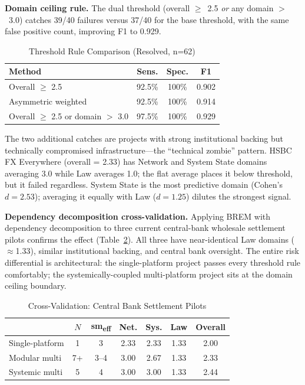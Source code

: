 \documentclass[conference]{IEEEtran}
\begin{document}
\textbf{Domain ceiling rule.} The dual threshold (overall $\geq$~2.5 \textit{or} any domain $>$~3.0) catches 39/40 failures versus 37/40 for the base threshold, with the same false positive count, improving F1 to 0.929.

\begin{table}[htbp]
\caption{Threshold Rule Comparison (Resolved, n=62)}
\label{tab:thresholds}
\centering
\begin{tabular}{lccc}
\toprule
\textbf{Method} & \textbf{Sens.} & \textbf{Spec.} & \textbf{F1} \\
\midrule
Overall $\geq$ 2.5 & 92.5\% & 100\% & 0.902 \\
Asymmetric weighted & 92.5\% & 100\% & 0.914 \\
Overall $\geq$ 2.5 or domain $>$ 3.0 & 97.5\% & 100\% & 0.929 \\
\bottomrule
\end{tabular}
\end{table}

The two additional catches are projects with strong institutional backing but technically compromised infrastructure---the ``technical zombie'' pattern. HSBC FX Everywhere (overall = 2.33) has Network and System State domains averaging 3.0 while Law averages 1.0; the flat average places it below threshold, but it failed regardless. System State is the most predictive domain (Cohen's $d = 2.53$); averaging it equally with Law ($d = 1.25$) dilutes the strongest signal.

\textbf{Dependency decomposition cross-validation.} Applying BREM with dependency decomposition to three current central-bank wholesale settlement pilots confirms the effect (Table~\ref{tab:crossval}). All three have near-identical Law domains ($\approx$1.33), similar institutional backing, and central bank oversight. The entire risk differential is architectural: the single-platform project passes every threshold rule comfortably; the systemically-coupled multi-platform project sits at the domain ceiling boundary.

\begin{table}[htbp]
\caption{Cross-Validation: Central Bank Settlement Pilots}
\label{tab:crossval}
\centering
\begin{tabular}{lcccccc}
\toprule
& \textbf{$N$} & \textbf{sm\textsubscript{eff}} & \textbf{Net.} & \textbf{Sys.} & \textbf{Law} & \textbf{Overall} \\
\midrule
Single-platform & 1 & 3 & 2.33 & 2.33 & 1.33 & 2.00 \\
Modular multi & 7+ & 3--4 & 3.00 & 2.67 & 1.33 & 2.33 \\
Systemic multi & 5 & 4 & 3.00 & 3.00 & 1.33 & 2.44 \\
\bottomrule
\end{tabular}
\end{table}
\end{document}
